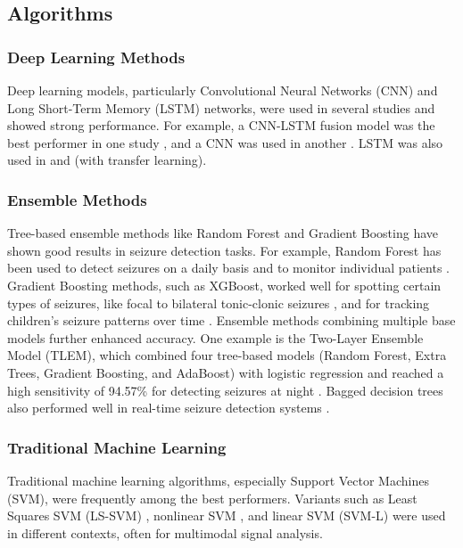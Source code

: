 \subsection{Algorithms}

\subsubsection{Deep Learning Methods}
Deep learning models, particularly Convolutional Neural Networks (CNN) and Long Short-Term Memory (LSTM) networks, were used in several studies and showed strong performance. For example, a CNN-LSTM fusion model was the best performer in one study \cite{Yu2023-ss}, and a CNN was used in another \cite{Tang2021-td}. LSTM was also used in \cite{Wang2025-ql} and \cite{Nasseri2021-xn} (with transfer learning).

\subsubsection{Ensemble Methods}
Tree-based ensemble methods like Random Forest and Gradient Boosting have shown good results in seizure detection tasks. For example, Random Forest has been used to detect seizures on a daily basis \cite{Wang2022-lt} and to monitor individual patients \cite{Forooghifar2022-dm}. Gradient Boosting methods, such as XGBoost, worked well for spotting certain types of seizures, like focal to bilateral tonic-clonic seizures \cite{Gharbi2024-ad}, and for tracking children's seizure patterns over time \cite{Jiang2022-zu}. Ensemble methods combining multiple base models further enhanced accuracy. One example is the Two-Layer Ensemble Model (TLEM), which combined four tree-based models (Random Forest, Extra Trees, Gradient Boosting, and AdaBoost) with logistic regression and reached a high sensitivity of 94.57\% for detecting seizures at night \cite{Dong2022-oo}. Bagged decision trees also performed well in real-time seizure detection systems \cite{Chowdhury2022-bi}.

\subsubsection{Traditional Machine Learning}
Traditional machine learning algorithms, especially Support Vector Machines (SVM), were frequently among the best performers. Variants such as Least Squares SVM (LS-SVM) \cite{Milosevic2016-ee}, nonlinear SVM \cite{Onorati2017-bn}, and linear SVM (SVM-L) \cite{Wang2025-my} were used in different contexts, often for multimodal signal analysis.

